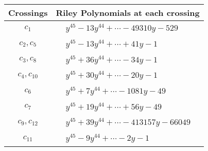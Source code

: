 \documentclass[1p]{elsarticle_modified}
\theoremstyle{definition}
\begin{document}
\begin{tabular}{m{50pt}|m{274pt}}
Crossings & \hspace{64pt}Riley Polynomials at each crossing \\
\hline $$\begin{aligned}c_{1}\end{aligned}$$&$\begin{aligned}
&y^{45}-13 y^{44}+\cdots-49310 y-529
\end{aligned}$\\
\hline $$\begin{aligned}c_{2},c_{5}\end{aligned}$$&$\begin{aligned}
&y^{45}-13 y^{44}+\cdots+41 y-1
\end{aligned}$\\
\hline $$\begin{aligned}c_{3},c_{8}\end{aligned}$$&$\begin{aligned}
&y^{45}+36 y^{44}+\cdots-34 y-1
\end{aligned}$\\
\hline $$\begin{aligned}c_{4},c_{10}\end{aligned}$$&$\begin{aligned}
&y^{45}+30 y^{44}+\cdots-20 y-1
\end{aligned}$\\
\hline $$\begin{aligned}c_{6}\end{aligned}$$&$\begin{aligned}
&y^{45}+7 y^{44}+\cdots-1081 y-49
\end{aligned}$\\
\hline $$\begin{aligned}c_{7}\end{aligned}$$&$\begin{aligned}
&y^{45}+19 y^{44}+\cdots+56 y-49
\end{aligned}$\\
\hline $$\begin{aligned}c_{9},c_{12}\end{aligned}$$&$\begin{aligned}
&y^{45}+39 y^{44}+\cdots-413157 y-66049
\end{aligned}$\\
\hline $$\begin{aligned}c_{11}\end{aligned}$$&$\begin{aligned}
&y^{45}-9 y^{44}+\cdots-2 y-1
\end{aligned}$\\
\hline
\end{tabular}\\~\\
\end{document}
